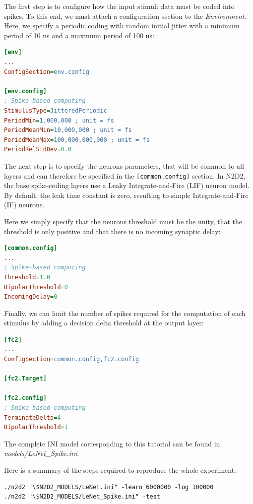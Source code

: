\documentclass[a4paper,11pt,oneside]{article}
\begin{document}
The first step is to configure how the input stimuli data must be coded into
spikes. To this end, we must attach a configuration section to the
\emph{Environment}. Here, we specify a periodic coding with random initial
jitter with a minimum period of 10 ns and a maximum period of 100 us:

\begin{lstlisting}[language=ini,escapechar=!]
[env]
...
ConfigSection=env.config

[env.config]
; Spike-based computing
StimulusType=JitteredPeriodic
PeriodMin=1,000,000 ; unit = fs
PeriodMeanMin=10,000,000 ; unit = fs
PeriodMeanMax=100,000,000,000 ; unit = fs
PeriodRelStdDev=0.0
\end{lstlisting}

The next step is to specify the neurons parameters, that will be common to all
layers and can therefore be specified in the \lstinline![common.config]!
section. In N2D2, the base spike-coding layers use a Leaky Integrate-and-Fire
(LIF) neuron model. By default, the leak time constant is zero, resulting
to simple Integrate-and-Fire (IF) neurons.

Here we simply specify that the neurons threshold must be the unity, that the
threshold is only positive and that there is no incoming synaptic delay:

\begin{lstlisting}[language=ini,escapechar=!]
[common.config]
...
; Spike-based computing
Threshold=1.0
BipolarThreshold=0
IncomingDelay=0
\end{lstlisting}

Finally, we can limit the number of spikes required for the computation of each
stimulus by adding a decision delta threshold at the output layer:

\begin{lstlisting}[language=ini,escapechar=!]
[fc2]
...
ConfigSection=common.config,fc2.config

[fc2.Target]

[fc2.config]
; Spike-based computing
TerminateDelta=4
BipolarThreshold=1
\end{lstlisting}

The complete INI model corresponding to this tutorial can be found in
\emph{models/LeNet\_Spike.ini}.

Here is a summary of the steps required to reproduce the whole experiment:

\begin{lstlisting}
./n2d2 "\$N2D2_MODELS/LeNet.ini" -learn 6000000 -log 100000
./n2d2 "\$N2D2_MODELS/LeNet_Spike.ini" -test
\end{lstlisting}
\end{document}
